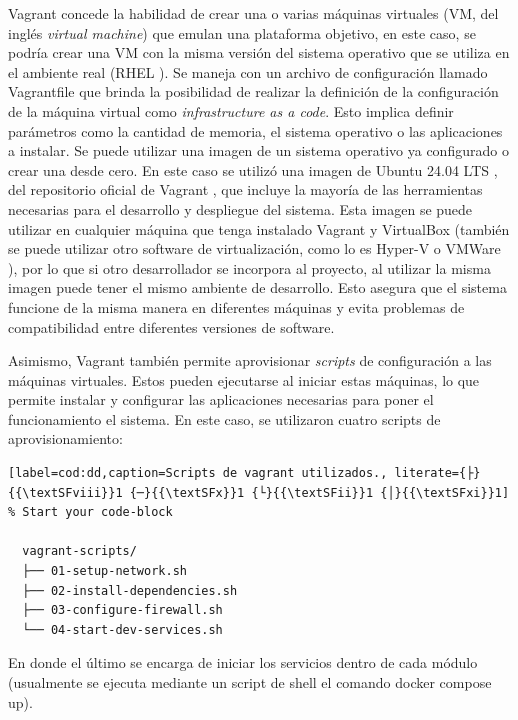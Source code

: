 Vagrant concede la habilidad de crear una o varias máquinas virtuales (VM, del inglés \textit{virtual machine}) que emulan una plataforma objetivo, en este caso, se podría crear una VM con la misma versión del sistema operativo que se utiliza en el ambiente real (RHEL \citep{red_hat_sistema_nodate}). Se maneja con un archivo de configuración llamado Vagrantfile que brinda la posibilidad de realizar la definición de la configuración de la máquina virtual como \textit{infrastructure as a code}. Esto implica definir parámetros como la cantidad de memoria, el sistema operativo o las aplicaciones a instalar. Se puede utilizar una imagen de un sistema operativo ya configurado o crear una desde cero. En este caso se utilizó una imagen de Ubuntu 24.04 LTS \citep{progress_chefs_bento_bentoubuntu-2404_nodate}, del repositorio oficial de Vagrant \citep{hashicorp_hashicorp_nodate}, que incluye la mayoría de las herramientas necesarias para el desarrollo y despliegue del sistema. Esta imagen se puede utilizar en cualquier máquina que tenga instalado Vagrant y VirtualBox \citep{wikipedia_virtualbox_2025} (también se puede utilizar otro software de virtualización, como lo es Hyper-V \citep{meaghanlewis_informacion_2025} o VMWare \citep{wikipedia_vmware_2025}), por lo que si otro desarrollador se incorpora al proyecto, al utilizar la misma imagen puede tener el mismo ambiente de desarrollo. Esto asegura que el sistema funcione de la misma manera en diferentes máquinas y evita problemas de compatibilidad entre diferentes versiones de software.

Asimismo, Vagrant también permite aprovisionar \textit{scripts} de configuración a las máquinas virtuales. Estos pueden ejecutarse al iniciar estas máquinas, lo que permite instalar y configurar las aplicaciones necesarias para poner el funcionamiento el sistema. En este caso, se utilizaron cuatro scripts de aprovisionamiento:

\begin{lstlisting}[label=cod:dd,caption=Scripts de vagrant utilizados., literate={├}{{\textSFviii}}1 {─}{{\textSFx}}1 {└}{{\textSFii}}1 {│}{{\textSFxi}}1]  % Start your code-block

  vagrant-scripts/
  ├── 01-setup-network.sh
  ├── 02-install-dependencies.sh
  ├── 03-configure-firewall.sh
  └── 04-start-dev-services.sh

\end{lstlisting}

En donde el último se encarga de iniciar los servicios dentro de cada módulo (usualmente se ejecuta mediante un script de shell el comando docker compose up).

